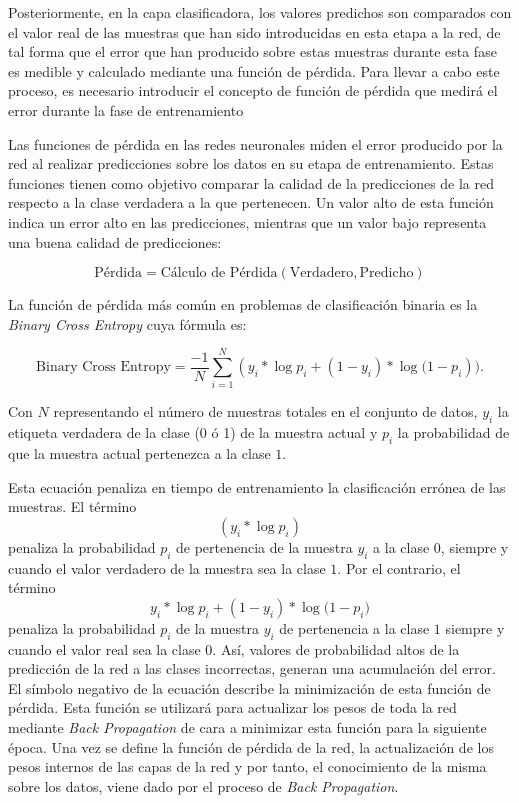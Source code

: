 Posteriormente, en la capa clasificadora, los valores predichos son comparados con el valor real de las muestras que han sido introducidas en esta etapa a la red, de tal forma que el error que han producido sobre estas muestras durante esta fase es medible y calculado mediante una función de pérdida. Para llevar a cabo este proceso, es necesario introducir el concepto de función de pérdida que medirá el error durante la fase de entrenamiento



Las funciones de pérdida en las redes neuronales miden el error producido por la red al realizar predicciones sobre los datos en su etapa de entrenamiento. Estas funciones tienen como objetivo comparar la calidad de la predicciones de la red respecto a la clase verdadera a la que pertenecen. Un valor alto de esta función indica un error alto en las predicciones, mientras que un valor bajo representa una buena calidad de predicciones:

\[
\text{Pérdida} = \text{Cálculo de Pérdida} (\text{Verdadero}, \text{Predicho})
\]

La función de pérdida más común en problemas de clasificación binaria es la \textit{Binary Cross Entropy} cuya fórmula es:

$$\text{Binary Cross Entropy} = \frac{-1}{N} \sum_{i=1}^{N} (y_{i}*\log{p_{i}}+ (1 - y_{i})*\log{(1-p_{i}})).$$

Con $N$ representando el número de muestras totales en el conjunto de datos, $y_i$ la etiqueta verdadera de la clase (0 ó 1) de la muestra actual y $p_i$ la probabilidad de que la muestra actual pertenezca a la clase $1$.

Esta ecuación penaliza en tiempo de entrenamiento la clasificación errónea de las muestras. El término $$(y_{i}*\log p_{i})$$ penaliza la probabilidad $p_i$ de pertenencia de la muestra $y_i$ a la clase $0$, siempre y cuando el valor verdadero de la muestra sea la clase $1$. Por el contrario, el término 
$$y_{i}*\log{p_{i}}+ (1 - y_{i})*\log{(1-p_{i}})$$
penaliza la probabilidad $p_i$ de la muestra $y_i$ de pertenencia a la clase $1$ siempre y cuando el valor real sea la clase $0$. Así, valores de probabilidad altos de la predicción de la red a las clases incorrectas, generan una acumulación del error. El símbolo negativo de la ecuación describe la minimización de esta función de pérdida. Esta función se utilizará para actualizar los pesos de toda la red mediante \textit{Back Propagation} de cara a minimizar esta función para la siguiente época. Una vez se define la función de pérdida de la red, la actualización de los pesos internos de las capas de la red y por tanto, el conocimiento de la misma sobre los datos, viene dado por el proceso de \textit{Back Propagation}.

